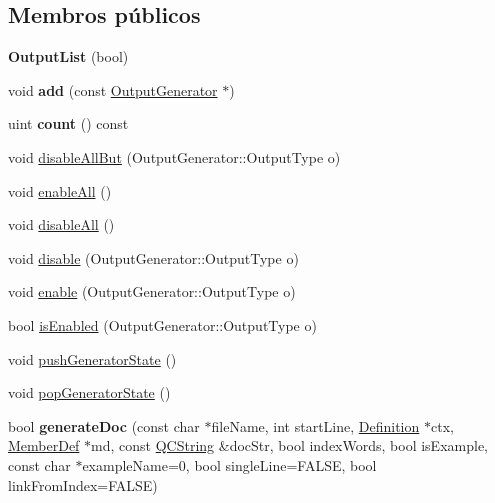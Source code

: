 \subsection*{Membros públicos}
\begin{DoxyCompactItemize}
\item 
\hypertarget{class_output_list_a1cf20ef0a626c7a04e5d2623b05e6a77}{{\bfseries Output\-List} (bool)}\label{class_output_list_a1cf20ef0a626c7a04e5d2623b05e6a77}

\item 
\hypertarget{class_output_list_aa3dbc8949501869dd4ded010b0a19cb9}{void {\bfseries add} (const \hyperlink{class_output_generator}{Output\-Generator} $\ast$)}\label{class_output_list_aa3dbc8949501869dd4ded010b0a19cb9}

\item 
\hypertarget{class_output_list_a774149fc271ebaba2aabcd183a836e8f}{uint {\bfseries count} () const }\label{class_output_list_a774149fc271ebaba2aabcd183a836e8f}

\item 
void \hyperlink{class_output_list_af6f08b1d8f3504c943adc7626e6336fb}{disable\-All\-But} (Output\-Generator\-::\-Output\-Type o)
\item 
void \hyperlink{class_output_list_ae076f3f35c07044ed812b78871741c15}{enable\-All} ()
\item 
void \hyperlink{class_output_list_a238885c747f586049b766fa4fcd5ec12}{disable\-All} ()
\item 
void \hyperlink{class_output_list_a518c3abda47a43b82e5ec04ee06a3f94}{disable} (Output\-Generator\-::\-Output\-Type o)
\item 
void \hyperlink{class_output_list_af50cca806934038f9eb543edaddf998f}{enable} (Output\-Generator\-::\-Output\-Type o)
\item 
bool \hyperlink{class_output_list_ad28f007ae83273a7d1ca6a6b46979af9}{is\-Enabled} (Output\-Generator\-::\-Output\-Type o)
\item 
void \hyperlink{class_output_list_aff968dbb6182903ac3a2c899cf1078f3}{push\-Generator\-State} ()
\item 
void \hyperlink{class_output_list_a9fd3c9d8d193a665b4b1c233ae573753}{pop\-Generator\-State} ()
\item 
\hypertarget{class_output_list_a197b538c4355c7fa65472cea5e6f16bf}{bool {\bfseries generate\-Doc} (const char $\ast$file\-Name, int start\-Line, \hyperlink{class_definition}{Definition} $\ast$ctx, \hyperlink{class_member_def}{Member\-Def} $\ast$md, const \hyperlink{class_q_c_string}{Q\-C\-String} \&doc\-Str, bool index\-Words, bool is\-Example, const char $\ast$example\-Name=0, bool single\-Line=F\-A\-L\-S\-E, bool link\-From\-Index=F\-A\-L\-S\-E)}\label{class_output_list_a197b538c4355c7fa65472cea5e6f16bf}


\end{DoxyCompactItemize}
